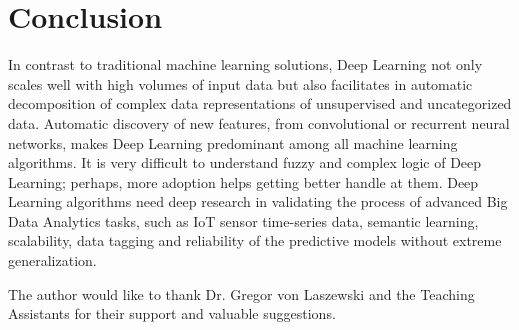 \documentclass[sigconf]{acmart}
\begin{document}
	\section{Conclusion}		

	In contrast to traditional machine learning solutions, Deep Learning not only scales well with high volumes of input data but also facilitates in automatic decomposition of complex data representations of unsupervised and uncategorized data. Automatic discovery of new features, from convolutional or recurrent neural networks, makes Deep Learning predominant among all machine learning algorithms. It is very difficult to understand fuzzy and complex logic of Deep Learning; perhaps, more adoption helps getting better handle at them. Deep Learning algorithms need deep research in validating the process of advanced Big Data Analytics tasks, such as IoT sensor time-series data, semantic learning, scalability, data tagging and reliability of the predictive models without extreme generalization.  
	
	
\begin{acks}		
	
The author would like to thank Dr. Gregor von Laszewski and the Teaching Assistants for their support and valuable suggestions.
		
\end{acks}


 
	

	
\end{document}
